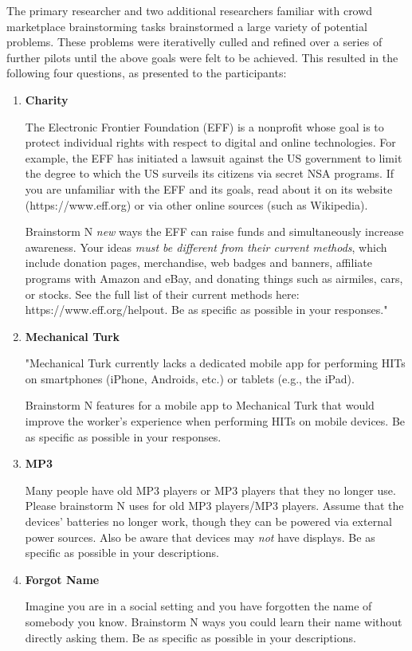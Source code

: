 The primary researcher and two additional researchers familiar with crowd marketplace brainstorming tasks brainstormed a large variety of potential problems. These problems were iterativelly culled and refined over a series of further pilots until the above goals were felt to be achieved. This resulted in the following four questions, as presented to the participants:

\begin{enumerate}
\item \textbf{Charity}

The Electronic Frontier Foundation (EFF) is a nonprofit whose goal is to protect individual rights with respect to digital and online technologies. For example, the EFF has initiated a lawsuit against the US government to limit the degree to which the US surveils its citizens via secret NSA programs. If you are unfamiliar with the EFF and its goals, read about it on its website (https://www.eff.org) or via other online sources (such as Wikipedia).

Brainstorm N \emph{new} ways the EFF can raise funds and simultaneously increase awareness. Your ideas \emph{must be different from their current methods}, which include donation pages, merchandise, web badges and banners, affiliate programs with Amazon and eBay, and donating things such as airmiles, cars, or stocks. See the full list of their current methods here: https://www.eff.org/helpout. Be as specific as possible in your responses."

\item \textbf{Mechanical Turk}

"Mechanical Turk currently lacks a dedicated mobile app for performing HITs on smartphones (iPhone, Androids, etc.) or tablets (e.g., the iPad).

Brainstorm N features for a mobile app to Mechanical Turk that would improve the worker's experience when performing HITs on mobile devices. Be as specific as possible in your responses.

\item \textbf{MP3}

Many people have old MP3 players or MP3 players that they no longer use. Please brainstorm N uses for old MP3 players/MP3 players. Assume that the devices' batteries no longer work, though they can be powered via external power sources. Also be aware that devices may \emph{not} have displays. Be as specific as possible in your descriptions.

\item \textbf{Forgot Name}

Imagine you are in a social setting and you have forgotten the name of somebody you know. Brainstorm N ways you could learn their name without directly asking them. Be as specific as possible in your descriptions.

\end{enumerate}

